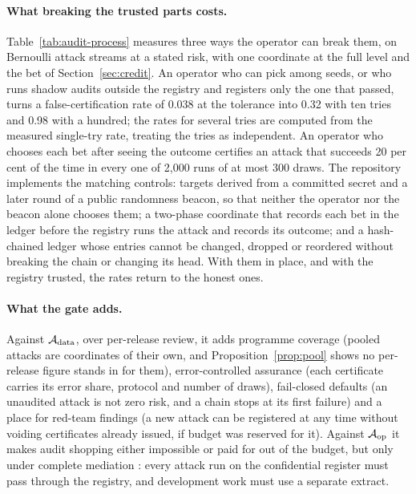 \documentclass{jpc}
\theoremstyle{remark}
\begin{document}
\paragraph{What breaking the trusted parts costs.} Table~\ref{tab:audit-process} measures three ways the operator can break them, on Bernoulli attack streams at a stated risk, with one coordinate at the full level and the bet of Section~\ref{sec:credit}. An operator who can pick among seeds, or who runs shadow audits outside the registry and registers only the one that passed, turns a false-certification rate of 0.038 at the tolerance into 0.32 with ten tries and 0.98 with a hundred; the rates for several tries are computed from the measured single-try rate, treating the tries as independent. An operator who chooses each bet after seeing the outcome certifies an attack that succeeds 20 per cent of the time in every one of 2{,}000 runs of at most 300 draws. The repository implements the matching controls: targets derived from a committed secret and a later round of a public randomness beacon, so that neither the operator nor the beacon alone chooses them; a two-phase coordinate that records each bet in the ledger before the registry runs the attack and records its outcome; and a hash-chained ledger whose entries cannot be changed, dropped or reordered without breaking the chain or changing its head. With them in place, and with the registry trusted, the rates return to the honest ones.



\paragraph{What the gate adds.} Against $\mathcal A_{\rm data}$, over per-release review, it adds programme coverage (pooled attacks are coordinates of their own, and Proposition~\ref{prop:pool} shows no per-release figure stands in for them), error-controlled assurance (each certificate carries its error share, protocol and number of draws), fail-closed defaults (an unaudited attack is not zero risk, and a chain stops at its first failure) and a place for red-team findings (a new attack can be registered at any time without voiding certificates already issued, if budget was reserved for it). Against $\mathcal A_{\rm op}$ it makes audit shopping either impossible or paid for out of the budget, but only under complete mediation \cite{saltzer1975}: every attack run on the confidential register must pass through the registry, and development work must use a separate extract.
\end{document}
